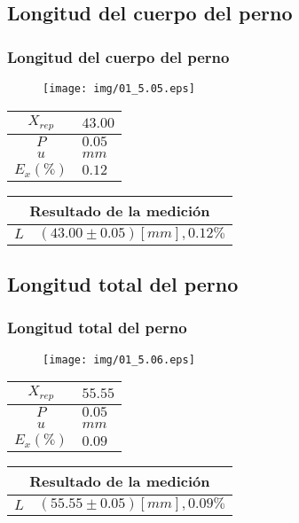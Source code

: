 \documentclass[letter,11pt]{beamer}
\begin{document}
\subsection{Longitud del cuerpo del perno}
\begin{frame}
\frametitle{Longitud del cuerpo del perno}
\vspace*{0.8cm}
\begin{figure}
\centering
\texttt{[image: img/01\_5.05.eps]}
\end{figure}
\vspace*{0.4cm}
\scriptsize
\begin{tabular}{|c|>{\centering}m{1.8cm}<{\centering}|}
\hline
$X_{rep}$ &  $43.00$ \tabularnewline \hline
      $P$ &   $0.05$ \tabularnewline \hline
      $u$ &     $mm$ \tabularnewline \hline
$E_x(\%)$ &   $0.12$ \tabularnewline \hline
\end{tabular}
\quad
\begin{tabular}{|c|>{\centering}m{5.7cm}<{\centering}|}
\hline
\multicolumn{2}{|c|}{\textbf{Resultado de la medición}} \\ \hline
$L$ & $( 43.00\pm0.05)[mm], 0.12\%$ \tabularnewline \hline
\end{tabular}
\end{frame}

\subsection{Longitud total del perno}
\begin{frame}
\frametitle{Longitud total del perno}
\vspace*{0.8cm}
\begin{figure}
\centering
\texttt{[image: img/01\_5.06.eps]}
\end{figure}
\vspace*{0.4cm}
\scriptsize
\begin{tabular}{|c|>{\centering}m{1.8cm}<{\centering}|}
\hline
$X_{rep}$ &  $55.55$ \tabularnewline \hline
      $P$ &   $0.05$ \tabularnewline \hline
      $u$ &     $mm$ \tabularnewline \hline
$E_x(\%)$ &   $0.09$ \tabularnewline \hline
\end{tabular}
\quad
\begin{tabular}{|c|>{\centering}m{5.7cm}<{\centering}|}
\hline
\multicolumn{2}{|c|}{\textbf{Resultado de la medición}} \\ \hline
$L$ & $( 55.55\pm0.05)[mm], 0.09\%$ \tabularnewline \hline
\end{tabular}
\end{frame}
\end{document}
